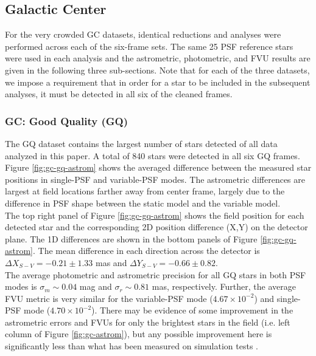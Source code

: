 \documentclass[]{spie}  %
\begin{document}
\subsection{Galactic Center} \label{sec:results-gc}

\indent For the very crowded GC datasets, identical reductions and analyses were performed across each of the six-frame sets. The same 25 PSF reference stars were used in each analysis and the astrometric, photometric, and FVU results are given in the following three sub-sections. Note that for each of the three datasets, we impose a requirement that in order for a star to be included in the subsequent analyses, it must be detected in all six of the cleaned frames.

\subsubsection{GC: Good Quality (GQ)} \label{sec:results-gc-GQ}
\noindent The GQ dataset contains the largest number of stars detected of all data analyzed in this paper. A total of 840 stars were detected in all six GQ frames. Figure \ref{fig:gc-gq-astrom} shows the averaged difference between the measured star positions in single-PSF and variable-PSF modes. The astrometric differences are largest at field locations farther away from center frame, largely due to the difference in PSF shape between the static model and the variable model.
\\
\indent The top right panel of Figure \ref{fig:gc-gq-astrom} shows the field position for each detected star and the corresponding 2D position difference (X,Y) on the detector plane. The 1D differences are shown in the bottom panels of Figure \ref{fig:gc-gq-astrom}. The mean difference in each direction across the detector is $\Delta X_{S-V} = -0.21 \pm 1.33$ mas and $\Delta Y_{S-V} = -0.66 \pm 0.82$.
\\
\indent The average photometric and astrometric precision for all GQ stars in both PSF modes is $\sigma_{{m}}{\sim}0.04$ mag and $\sigma_{{r}}{\sim}0.81$ mas, respectively. Further, the average FVU metric is very similar for the variable-PSF mode ($4.67\times10^{-2}$) and single-PSF mode ($4.70\times10^{-2}$). There may be evidence of some improvement in the astrometric errors and FVUs for only the brightest stars in the field (i.e. left column of Figure \ref{fig:gc-astrom}), but any possible improvement here is significantly less than what has been measured on simulation tests \cite{Turri:inprep}.
\end{document}
